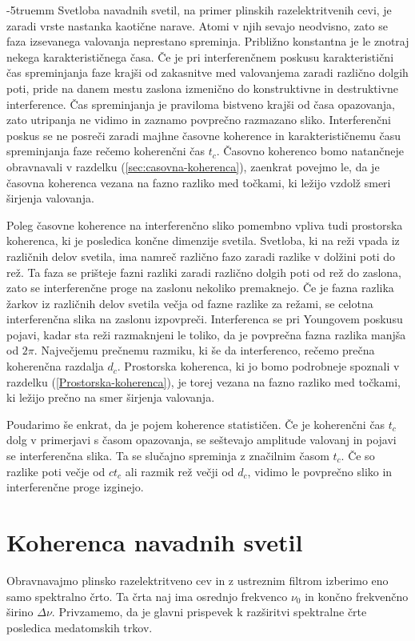 \vglue-5truemm
Svetloba navadnih svetil, na primer plinskih razelektritvenih cevi, 
je zaradi vrste nastanka kaotične narave. 
Atomi v njih sevajo neodvisno, zato se faza izsevanega valovanja neprestano
spreminja. Približno konstantna je le znotraj nekega karakterističnega
časa. Če je pri interferenčnem poskusu karakteristični čas spreminjanja
faze krajši od zakasnitve med valovanjema zaradi različno
dolgih poti, pride na danem mestu zaslona izmenično do konstruktivne in 
destruktivne interference. Čas spreminjanja je praviloma
bistveno krajši od časa opazovanja, zato utripanja ne vidimo in 
zaznamo povprečno razmazano sliko. Interferenčni poskus se ne 
posreči zaradi majhne časovne koherence in
karakterističnemu času spreminjanja faze rečemo 
koherenčni čas
$t_{c}$. Časovno koherenco bomo natančneje obravnavali v razdelku
(\ref{sec:casovna-koherenca}), zaenkrat povejmo le, da je časovna
koherenca vezana na fazno razliko med točkami, ki ležijo
vzdolž smeri širjenja valovanja. 

Poleg časovne koherence na interferenčno sliko pomembno vpliva tudi
prostorska koherenca, ki je posledica
končne dimenzije svetila. Svetloba, ki na reži vpada iz različnih delov
svetila, ima namreč različno fazo zaradi razlike v dolžini poti 
do rež. Ta faza se prišteje fazni razliki zaradi različno dolgih poti 
od rež do zaslona, zato se interferenčne proge na zaslonu nekoliko 
premaknejo. Če je fazna razlika žarkov iz različnih
delov svetila večja od fazne razlike za režami, se celotna interferenčna
slika na zaslonu izpovpreči. Interferenca se pri Youngovem poskusu
pojavi, kadar sta reži razmaknjeni le toliko, da je povprečna fazna
razlika manjša od $2\pi$. Največjemu prečnemu razmiku, ki še da interferenco,
rečemo prečna koherenčna razdalja $d_{c}$. 
Prostorska koherenca, ki jo bomo podrobneje spoznali v razdelku 
(\ref{Prostorska-koherenca}),
je torej vezana na fazno razliko med točkami, ki ležijo prečno 
na smer širjenja valovanja.

Poudarimo še enkrat, da je pojem koherence statističen.
Če je koherenčni čas $t_{c}$ dolg v primerjavi s časom opazovanja,
se seštevajo amplitude valovanj in pojavi se interferenčna slika.
Ta se slučajno spreminja z značilnim časom $t_{c}$. Če so razlike
poti večje od $ct_{c}$ ali razmik rež večji od $d_{c}$, vidimo
le povprečno sliko in interferenčne proge izginejo.

\section{Koherenca navadnih svetil}
\label{chap:kns}
Obravnavajmo plinsko razelektritveno cev in z
ustreznim filtrom izberimo eno samo spektralno črto. Ta črta naj ima
osrednjo frekvenco $\nu_{0}$ in končno frekvenčno širino $\Delta\nu$.
Privzamemo, da je glavni prispevek k razširitvi spektralne črte posledica
medatomskih trkov.


